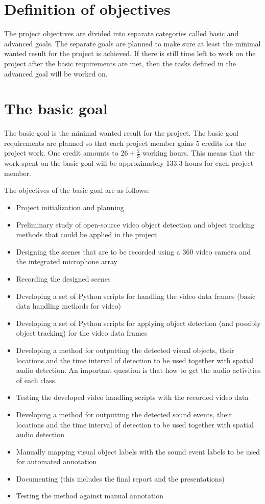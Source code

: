 \section{Definition of objectives}


The project objectives are divided into separate categories called basic and advanced goals. The separate goals are planned to make sure at least the minimal wanted result for the project is achieved. If there is still time left to work on the project after the basic requirements are met, then the tasks defined in the advanced goal will be worked on.

\section{The basic goal}

The basic goal is the minimal wanted result for the project. The basic goal requirements are planned so that each project member gains 5 credits for the project work. One credit amounts to $26+\frac{2}{3}$ working hours. This means that the work spent on the basic goal will be approximately 133.3 hours for each project member. 

The objectives of the basic goal are as follows:

\begin{itemize}
	\item Project initialization and planning
	\item Preliminary study of open-source video object detection and object tracking methods that could be applied in the project
	\item Designing the scenes that are to be recorded using a 360 video camera and the integrated microphone array
	\item Recording the designed scenes
	\item Developing a set of Python scripts for handling the video data frames (basic data handling methods for video)
	\item Developing a set of Python scripts for applying object detection (and possibly object tracking) for the video data frames
	\item Developing a method for outputting the detected visual objects, their locations and the time interval of detection to be used together with spatial audio detection. An important question is that how to get the audio
	activities of each class.
	\item Testing the developed video handling scripts with the recorded video data
	\item Developing a method for outputting the detected sound events, their locations and the time interval of detection to be used together with spatial audio detection
	\item Manually mapping visual object labels with the sound event labels to be used for automated annotation
	\item Documenting (this includes the final report and the presentations)
	\item Testing the method against manual annotation
\end{itemize} 

